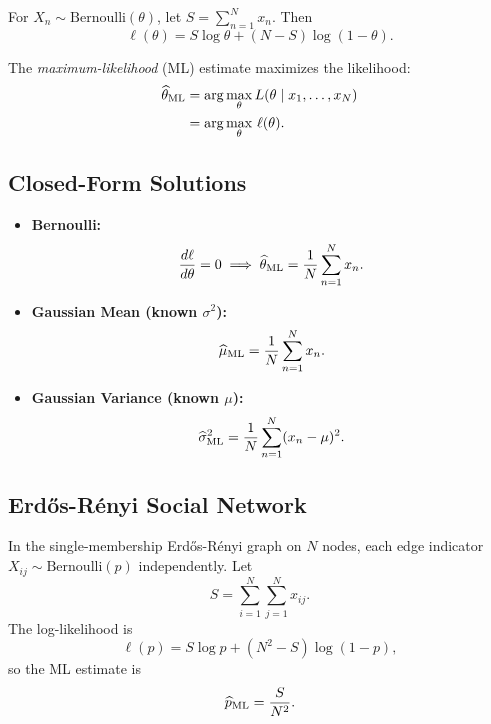 For $X_n\sim\mathrm{Bernoulli}(\theta)$, let $S=\sum_{n=1}^N x_n$.  Then
\begin{equation}
    \ell(\theta) = S\log\theta + (N-S)\log(1-\theta).
\end{equation}

The \emph{maximum-likelihood} (ML) estimate maximizes the likelihood:
\begin{align}
    \widehat\theta_{\rm ML} & = \arg\max_{\theta} L(\theta\mid x_1,\dots,x_N) \\
                            & = \arg\max_{\theta}\,\ell(\theta).
\end{align}

\subsection{Closed-Form Solutions}

\begin{itemize}
    \item \textbf{Bernoulli:}
          \begin{equation}
              \frac{d\ell}{d\theta}=0
              \;\Longrightarrow\;
              \widehat\theta_{\rm ML}
              = \frac{1}{N}\sum_{n=1}^N x_n.
          \end{equation}
    \item \textbf{Gaussian Mean (known \(\sigma^2\)):}
          \begin{equation}
              \widehat\mu_{\rm ML}
              = \frac{1}{N}\sum_{n=1}^N x_n.
          \end{equation}
    \item \textbf{Gaussian Variance (known \(\mu\)):}
          \begin{equation}
              \widehat{\sigma}^2_{\rm ML}
              = \frac{1}{N}\sum_{n=1}^N (x_n-\mu)^2.
          \end{equation}
\end{itemize}

\subsection{Erdős-Rényi Social Network}

In the single-membership Erdős-Rényi graph on $N$ nodes, each edge indicator
$X_{ij}\sim\mathrm{Bernoulli}(p)$ independently.  Let
\begin{equation}
    S=\sum_{i=1}^N\sum_{j=1}^N x_{ij}.
\end{equation}
The log-likelihood is
\begin{equation}
    \ell(p)=S\log p + (N^2 - S)\log(1-p),
\end{equation}
so the ML estimate is
\begin{equation}
    \widehat p_{\rm ML}
    = \frac{S}{N^2}.
\end{equation}

